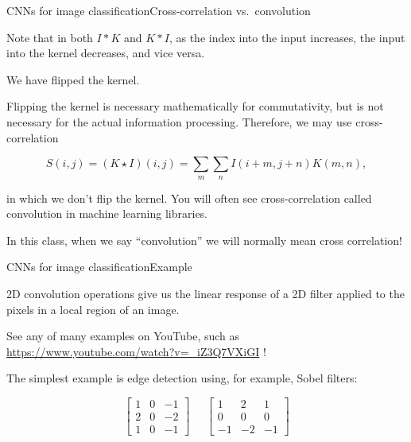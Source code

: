 \documentclass{beamer}
\begin{document}
\begin{frame}{CNNs for image classification}{Cross-correlation vs.\ convolution}

Note that in both $I * K$ and $K * I$, as the index into the
input \alert{increases}, the input into the kernel \alert{decreases},
and vice versa.

\medskip

We have \alert{flipped} the kernel.

\medskip

Flipping the kernel is necessary mathematically for commutativity, but
is not necessary for the actual information processing. Therefore, we
may use \alert{cross-correlation}

$$S(i,j) = (K \star I)(i,j) = \sum_m \sum_n I(i+m,j+n)K(m,n),$$

in which we don't flip the kernel. You will often see cross-correlation
called convolution in machine learning libraries.

\medskip

In this class, when we say ``convolution'' we will normally mean cross
correlation!

\end{frame}


\begin{frame}{CNNs for image classification}{Example}

  2D convolution operations give us the linear response of a 2D filter
  applied to the pixels in a local region of an image.

  \medskip

  See any of many examples on YouTube, such as
  \url{https://www.youtube.com/watch?v=_iZ3Q7VXiGI} !

  \medskip

  The simplest example is edge detection using, for example, Sobel
  filters:

  $$\begin{bmatrix} 1 & 0 & -1 \\ 2 & 0 & -2 \\ 1 & 0 & -1 \end{bmatrix}
  \;\;\;\;\;
  \begin{bmatrix} 1 & 2 & 1 \\ 0 & 0 & 0 \\ -1 & -2 & -1 \end{bmatrix}$$

\end{frame}
\end{document}
